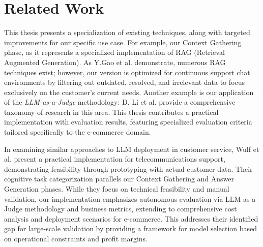 \chapter{Related Work}
\label{cha:related-work}

This thesis presents a specialization of existing techniques, along with targeted improvements for our specific use case.
For example, our Context Gathering phase, as it represents a specialized implementation of RAG (Retrieval Augmented Generation).
As Y.Gao et al. \cite{gao2023retrieval} demonstrate, numerous RAG techniques exist; however, our version is optimized for continuous support chat environments by filtering out outdated, resolved, and irrelevant data to focus exclusively on the customer's current needs.
Another example is our application of the \textit{LLM-as-a-Judge} methodology: D. Li et al. \cite{llmasajudge_applications} provide a comprehensive taxonomy of research in this area.
This thesis contributes a practical implementation with evaluation results, featuring specialized evaluation criteria tailored specifically to the e-commerce domain.

In examining similar approaches to LLM deployment in customer service, Wulf et al. \cite{wulf2024exploringpotentiallargelanguage} present a practical implementation for telecommunications support, demonstrating feasibility through prototyping with actual customer data.
Their cognitive task categorization parallels our Context Gathering and Answer Generation phases.
While they focus on technical feasibility and manual validation, our implementation emphasizes autonomous evaluation via LLM-as-a-Judge methodology and business metrics, extending to comprehensive cost analysis and deployment scenarios for e-commerce.
This addresses their identified gap for large-scale validation by providing a framework for model selection based on operational constraints and profit margins.
